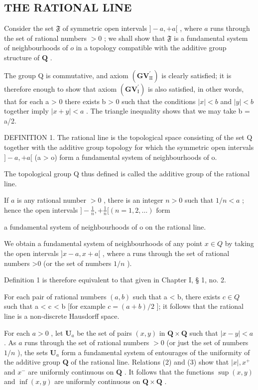 \subsection{THE RATIONAL LINE}

Consider the set \(\mathfrak{F}\) of symmetric open intervals \(]-a, +a[\) , where \(a\) runs through the set of rational numbers \(>0\) ; we shall show that \(\mathfrak{F}\) is a fundamental system of neighbourhoods of \(o\) in a topology compatible with the additive group structure of \(\mathbf{Q}\) .

The group Q is commutative, and axiom \((\mathbf{GV}_{\mathrm{II}}^{\prime})\) is clearly satisfied; it is therefore enough to show that axiom \((\mathbf{GV}_{\mathrm{I}}^{\prime})\) is also satisfied, in other words, that for each a \textgreater{} 0 there exists b \textgreater{} 0 such that the conditions \(|x| < b\) and \(|y| < b\) together imply \(|x + y| < a\) . The triangle inequality shows that we may take b = a/2.

DEFINITION 1. The rational line is the topological space consisting of the set Q together with the additive group topology for which the symmetric open intervals \(]-a, +a[\) (a \textgreater{} o) form a fundamental system of neighbourhoods of o.

The topological group Q thus defined is called the additive group of the rational line.

If \(a\) is any rational number \(> 0\) , there is an integer \(n > 0\) such that \(1 / n < a\) ; hence the open intervals \(] - \frac{1}{n}, + \frac{1}{n} [ (n = 1, 2, \ldots) \text{ form}\)

a fundamental system of neighbourhoods of o on the rational line.

We obtain a fundamental system of neighbourhoods of any point \(x \in Q\) by taking the open intervals \(]x - a, x + a[\) , where a runs through the set of rational numbers \textgreater0 (or the set of numbers \(1/n\) ).

Definition 1 is therefore equivalent to that given in Chapter I, § 1, no. 2.

For each pair of rational numbers \((a, b)\) such that a \textless{} b, there exists \(c \in Q\) such that a \textless{} c \textless{} b {[}for example \(c = (a + b)/2\) {]}; it follows that the rational line is a non-discrete Hausdorff space.

For each \(a > 0\) , let \(\mathbf{U}_a\) be the set of pairs \((x, y)\) in \(\mathbf{Q} \times \mathbf{Q}\) such that \(|x - y| < a\) . As \(a\) runs through the set of rational numbers \(> 0\) (or just the set of numbers \(1/n\) ), the sets \(\mathbf{U}_a\) form a fundamental system of entourages of the uniformity of the additive group \(\mathbf{Q}\) of the rational line. Relations (2) and (3) show that \(|x|, x^+\) and \(x^-\) are uniformly continuous on \(\mathbf{Q}\) . It follows that the functions \(\sup (x, y)\) and \(\inf (x, y)\) are uniformly continuous on \(\mathbf{Q} \times \mathbf{Q}\) .

